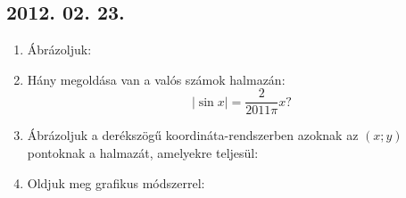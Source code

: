 \subsection*{2012. 02. 23.}
\begin{enumerate}
\item Ábrázoljuk:
\item Hány megoldása van a valós számok halmazán:
\[|\sin x|=\frac{2}{2011\pi}x?\]
\item Ábrázoljuk a derékszögű koordináta-rendszerben azoknak az $(x;y)$ pontoknak a halmazát, amelyekre teljesül:
\item Oldjuk meg grafikus módszerrel:
\end{enumerate}

